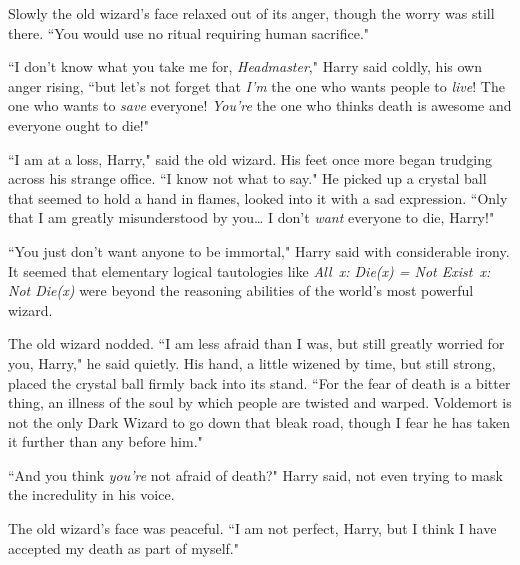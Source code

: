Slowly the old wizard's face relaxed out of its anger, though the worry was still there. ``You would use no ritual requiring human sacrifice."

``I don't know what you take me for, \emph{Headmaster}," Harry said coldly, his own anger rising, ``but let's not forget that \emph{I'm} the one who wants people to \emph{live}! The one who wants to \emph{save} everyone! \emph{You're} the one who thinks death is awesome and everyone ought to die!"

``I am at a loss, Harry," said the old wizard. His feet once more began trudging across his strange office. ``I know not what to say." He picked up a crystal ball that seemed to hold a hand in flames, looked into it with a sad expression. ``Only that I am greatly misunderstood by you{\ldots} I don't \emph{want} everyone to die, Harry!"

``You just don't want anyone to be immortal," Harry said with considerable irony. It seemed that elementary logical tautologies like \emph{All~x: Die(x) = Not Exist~x: Not Die(x)} were beyond the reasoning abilities of the world's most powerful wizard.

The old wizard nodded. ``I am less afraid than I was, but still greatly worried for you, Harry," he said quietly. His hand, a little wizened by time, but still strong, placed the crystal ball firmly back into its stand. ``For the fear of death is a bitter thing, an illness of the soul by which people are twisted and warped. Voldemort is not the only Dark Wizard to go down that bleak road, though I fear he has taken it further than any before him."

``And you think \emph{you're} not afraid of death?" Harry said, not even trying to mask the incredulity in his voice.

The old wizard's face was peaceful. ``I am not perfect, Harry, but I think I have accepted my death as part of myself."

